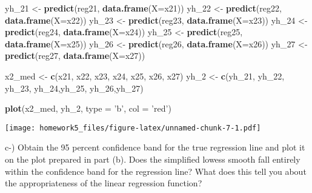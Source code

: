 \documentclass[
]{article}
\newenvironment{Shaded}{\begin{snugshade}}{\end{snugshade}}
\newcommand{\DataTypeTok}[1]{\textcolor[rgb]{0.13,0.29,0.53}{#1}}
\newcommand{\DecValTok}[1]{\textcolor[rgb]{0.00,0.00,0.81}{#1}}
\newcommand{\KeywordTok}[1]{\textcolor[rgb]{0.13,0.29,0.53}{\textbf{#1}}}
\newcommand{\NormalTok}[1]{#1}
\newcommand{\StringTok}[1]{\textcolor[rgb]{0.31,0.60,0.02}{#1}}
\begin{document}
\begin{Shaded}
\begin{Highlighting}[]
\NormalTok{yh_}\DecValTok{21}\NormalTok{ <-}\StringTok{ }\KeywordTok{predict}\NormalTok{(reg21, }\KeywordTok{data.frame}\NormalTok{(}\DataTypeTok{X=}\NormalTok{x21))}
\NormalTok{yh_}\DecValTok{22}\NormalTok{ <-}\StringTok{ }\KeywordTok{predict}\NormalTok{(reg22, }\KeywordTok{data.frame}\NormalTok{(}\DataTypeTok{X=}\NormalTok{x22))}
\NormalTok{yh_}\DecValTok{23}\NormalTok{ <-}\StringTok{ }\KeywordTok{predict}\NormalTok{(reg23, }\KeywordTok{data.frame}\NormalTok{(}\DataTypeTok{X=}\NormalTok{x23))}
\NormalTok{yh_}\DecValTok{24}\NormalTok{ <-}\StringTok{ }\KeywordTok{predict}\NormalTok{(reg24, }\KeywordTok{data.frame}\NormalTok{(}\DataTypeTok{X=}\NormalTok{x24))}
\NormalTok{yh_}\DecValTok{25}\NormalTok{ <-}\StringTok{ }\KeywordTok{predict}\NormalTok{(reg25, }\KeywordTok{data.frame}\NormalTok{(}\DataTypeTok{X=}\NormalTok{x25))}
\NormalTok{yh_}\DecValTok{26}\NormalTok{ <-}\StringTok{ }\KeywordTok{predict}\NormalTok{(reg26, }\KeywordTok{data.frame}\NormalTok{(}\DataTypeTok{X=}\NormalTok{x26))}
\NormalTok{yh_}\DecValTok{27}\NormalTok{ <-}\StringTok{ }\KeywordTok{predict}\NormalTok{(reg27, }\KeywordTok{data.frame}\NormalTok{(}\DataTypeTok{X=}\NormalTok{x27))}

\NormalTok{x2_med <-}\StringTok{ }\KeywordTok{c}\NormalTok{(x21, x22, x23, x24, x25, x26, x27)}
\NormalTok{yh_}\DecValTok{2}\NormalTok{ <-}\StringTok{ }\KeywordTok{c}\NormalTok{(yh_}\DecValTok{21}\NormalTok{, yh_}\DecValTok{22}\NormalTok{, yh_}\DecValTok{23}\NormalTok{, yh_}\DecValTok{24}\NormalTok{,yh_}\DecValTok{25}\NormalTok{, yh_}\DecValTok{26}\NormalTok{,yh_}\DecValTok{27}\NormalTok{)}

\KeywordTok{plot}\NormalTok{(x2_med, yh_}\DecValTok{2}\NormalTok{, }\DataTypeTok{type =} \StringTok{'b'}\NormalTok{, }\DataTypeTok{col =} \StringTok{'red'}\NormalTok{)}
\end{Highlighting}
\end{Shaded}

\texttt{[image: homework5\_files/figure-latex/unnamed-chunk-7-1.pdf]}

c-) Obtain the 95 percent confidence band for the true regression line
and plot it on the plot prepared in part (b). Does the simplified lowess
smooth fall entirely within the confidence band for the regression line?
What does this tell you about the appropriateness of the linear
regression function?
\end{document}
